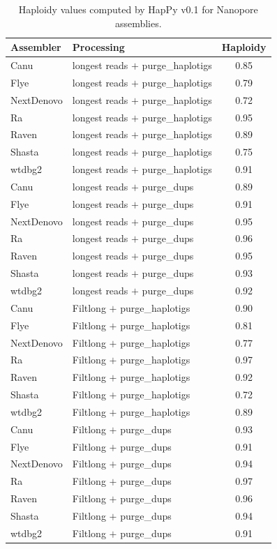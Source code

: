 \begin{suppsection}
\begin{table}[ht]
\centering
\caption{Haploidy values computed by HapPy v0.1 for Nanopore assemblies.}
\begin{tabular}{llc}
\hline
\textbf{Assembler} & \textbf{Processing} & \textbf{Haploidy} \\
\hline
Canu & longest reads $+$ purge\_haplotigs & 0.85 \\
Flye & longest reads $+$ purge\_haplotigs & 0.79 \\
NextDenovo & longest reads $+$ purge\_haplotigs & 0.72 \\
Ra & longest reads $+$ purge\_haplotigs & 0.95 \\
Raven & longest reads $+$ purge\_haplotigs & 0.89 \\
Shasta & longest reads $+$ purge\_haplotigs & 0.75 \\
wtdbg2 & longest reads $+$ purge\_haplotigs & 0.91 \\
Canu & longest reads $+$ purge\_dups & 0.89 \\
Flye & longest reads $+$ purge\_dups & 0.91 \\
NextDenovo & longest reads $+$ purge\_dups & 0.95 \\
Ra & longest reads $+$ purge\_dups & 0.96 \\
Raven & longest reads $+$ purge\_dups & 0.95 \\
Shasta & longest reads $+$ purge\_dups & 0.93 \\
wtdbg2 & longest reads $+$ purge\_dups & 0.92 \\
Canu & Filtlong $+$ purge\_haplotigs & 0.90 \\
Flye & Filtlong $+$ purge\_haplotigs & 0.81 \\
NextDenovo & Filtlong $+$ purge\_haplotigs & 0.77 \\
Ra & Filtlong $+$ purge\_haplotigs & 0.97 \\
Raven & Filtlong $+$ purge\_haplotigs & 0.92 \\
Shasta & Filtlong $+$ purge\_haplotigs & 0.72 \\
wtdbg2 & Filtlong $+$ purge\_haplotigs & 0.89 \\
Canu & Filtlong $+$ purge\_dups & 0.93 \\
Flye & Filtlong $+$ purge\_dups & 0.91 \\
NextDenovo & Filtlong $+$ purge\_dups & 0.94 \\
Ra & Filtlong $+$ purge\_dups & 0.97 \\
Raven & Filtlong $+$ purge\_dups & 0.96 \\
Shasta & Filtlong $+$ purge\_dups & 0.94 \\
wtdbg2 & Filtlong $+$ purge\_dups & 0.91 \\
\hline
\end{tabular}
\label{tab:nanopore_happy_part2}
\end{table}


\end{suppsection}
